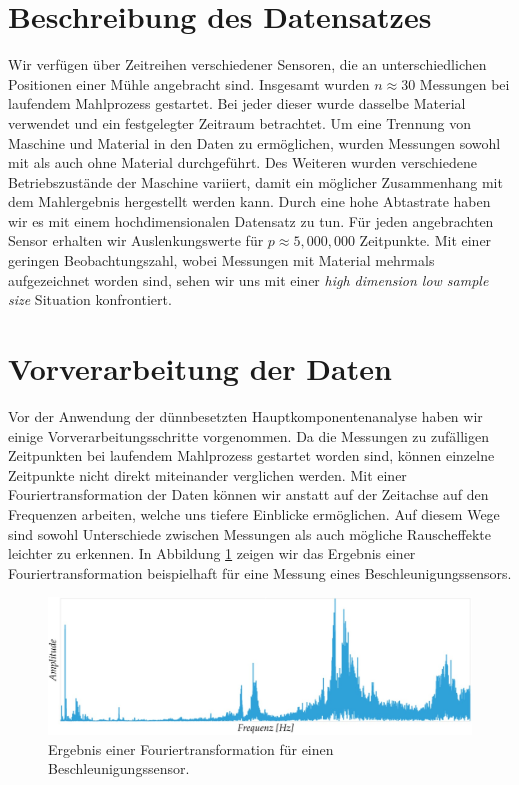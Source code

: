 \section{Beschreibung des Datensatzes}
\label{data_set}

Wir verfügen über Zeitreihen verschiedener Sensoren, 
die an unterschiedlichen Positionen einer Mühle angebracht sind. Insgesamt wurden $n \approx 30$ Messungen bei laufendem Mahlprozess gestartet. Bei jeder dieser wurde dasselbe Material verwendet und ein festgelegter Zeitraum betrachtet. Um eine Trennung von Maschine und Material in den Daten zu ermöglichen, wurden Messungen sowohl mit als auch ohne Material durchgeführt. Des Weiteren wurden verschiedene Betriebszustände der Maschine variiert, damit ein möglicher Zusammenhang mit dem Mahlergebnis hergestellt werden kann. Durch eine hohe Abtastrate haben wir es mit einem hochdimensionalen Datensatz zu tun. Für jeden angebrachten Sensor erhalten wir Auslenkungswerte für $p \approx 5,000,000$ Zeitpunkte. Mit einer geringen Beobachtungszahl, wobei Messungen mit Material mehrmals aufgezeichnet worden sind, sehen wir uns mit einer \textit{high dimension low sample size} Situation konfrontiert. 

\section{Vorverarbeitung der Daten}
\label{preprocessing}

Vor der Anwendung der dünnbesetzten Hauptkomponentenanalyse haben wir einige Vorverarbeitungsschritte vorgenommen. Da die Messungen zu zufälligen Zeitpunkten bei laufendem Mahlprozess gestartet worden sind, können einzelne Zeitpunkte nicht direkt miteinander verglichen werden. Mit einer Fouriertransformation der Daten können wir anstatt auf der Zeitachse auf den Frequenzen arbeiten, welche uns tiefere Einblicke ermöglichen. Auf diesem Wege sind sowohl Unterschiede zwischen Messungen als auch mögliche Rauscheffekte leichter zu erkennen. In Abbildung \ref{fft_example} zeigen wir das Ergebnis einer Fouriertransformation beispielhaft für eine Messung eines Beschleunigungssensors.

\begin{figure}
\centering
\includegraphics[width=\textwidth]{figures/Signal_5_fft_example_new.jpg}
\caption{Ergebnis einer Fouriertransformation für einen Beschleunigungssensor.}
\label{fft_example}
\end{figure}

